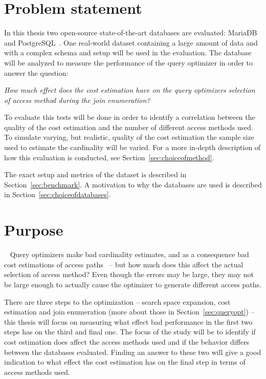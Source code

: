 \section{Problem statement}
In this thesis two open-source state-of-the-art databases are evaluated:
MariaDB~\cite{mariadb_m} and PostgreSQL~\cite{postgresql_ptwmaosd}. One
real-world dataset containing a large amount of data and with a complex schema
and setup will be used in the evaluation. The database will be analyzed to
measure the performance of the query optimizer in order to answer the question:

\textit{How much effect does the cost estimation have on the query optimizers
  selection of access method during the join enumeration?}

To evaluate this tests will be done in order to identify a correlation between
the quality of the cost estimation and the number of different access methods
used. To simulate varying, but realistic, quality of the cost estimation the
sample size used to estimate the cardinality will be varied. For a more in-depth
description of how this evaluation is conducted, see Section~\ref{sec:choiceofmethod}.

The exact setup and metrics of the dataset is described in
Section~\ref{sec:benchmark}. A motivation to why the databases are used is
described in Section~\ref{sec:choiceofdatabases}.

\section{Purpose}~\label{sec:purpose}
Query optimizers make bad cardinality estimates, and as a consequence bad cost
estimations of access paths~\cite{leis_2015_how_hgaqor} – but how much does this
affect the actual selection of access method? Even though the errors may be large,
they may not be large enough to actually cause the optimizer to generate
different access paths.

There are three steps to the optimization – search space expansion, cost
estimation and join enumeration (more about those in Section~\ref{sec:queryopt})
– this thesis will focus on measuring what effect bad performance in the first
two steps has on the third and final one. The focus of the study will be to
identify if cost estimation does affect the access methods used and if the
behavior differs between the databases evaluated. Finding an answer to these two
will give a good indication to what effect the cost estimation has on the final
step in terms of access methods used.

